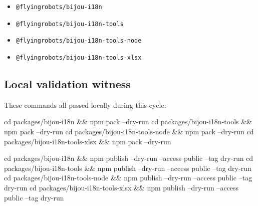 \begin{itemize}
\tightlist
\item
  \texttt{@\allowbreak{}f\allowbreak{}l\allowbreak{}y\allowbreak{}i\allowbreak{}n\allowbreak{}g\allowbreak{}r\allowbreak{}o\allowbreak{}b\allowbreak{}o\allowbreak{}t\allowbreak{}s\allowbreak{}/\allowbreak{}b\allowbreak{}i\allowbreak{}j\allowbreak{}o\allowbreak{}u\allowbreak{}-\allowbreak{}i\allowbreak{}1\allowbreak{}8\allowbreak{}n}
\item
  \texttt{@\allowbreak{}f\allowbreak{}l\allowbreak{}y\allowbreak{}i\allowbreak{}n\allowbreak{}g\allowbreak{}r\allowbreak{}o\allowbreak{}b\allowbreak{}o\allowbreak{}t\allowbreak{}s\allowbreak{}/\allowbreak{}b\allowbreak{}i\allowbreak{}j\allowbreak{}o\allowbreak{}u\allowbreak{}-\allowbreak{}i\allowbreak{}1\allowbreak{}8\allowbreak{}n\allowbreak{}-\allowbreak{}t\allowbreak{}o\allowbreak{}o\allowbreak{}l\allowbreak{}s}
\item
  \texttt{@\allowbreak{}f\allowbreak{}l\allowbreak{}y\allowbreak{}i\allowbreak{}n\allowbreak{}g\allowbreak{}r\allowbreak{}o\allowbreak{}b\allowbreak{}o\allowbreak{}t\allowbreak{}s\allowbreak{}/\allowbreak{}b\allowbreak{}i\allowbreak{}j\allowbreak{}o\allowbreak{}u\allowbreak{}-\allowbreak{}i\allowbreak{}1\allowbreak{}8\allowbreak{}n\allowbreak{}-\allowbreak{}t\allowbreak{}o\allowbreak{}o\allowbreak{}l\allowbreak{}s\allowbreak{}-\allowbreak{}n\allowbreak{}o\allowbreak{}d\allowbreak{}e}
\item
  \texttt{@\allowbreak{}f\allowbreak{}l\allowbreak{}y\allowbreak{}i\allowbreak{}n\allowbreak{}g\allowbreak{}r\allowbreak{}o\allowbreak{}b\allowbreak{}o\allowbreak{}t\allowbreak{}s\allowbreak{}/\allowbreak{}b\allowbreak{}i\allowbreak{}j\allowbreak{}o\allowbreak{}u\allowbreak{}-\allowbreak{}i\allowbreak{}1\allowbreak{}8\allowbreak{}n\allowbreak{}-\allowbreak{}t\allowbreak{}o\allowbreak{}o\allowbreak{}l\allowbreak{}s\allowbreak{}-\allowbreak{}x\allowbreak{}l\allowbreak{}s\allowbreak{}x}
\end{itemize}

\subsection{Local validation witness}\label{record-203-local-validation-witness}

These commands all passed locally during this cycle:

\begin{CodeBlock}
cd packages/bijou-i18n && npm pack --dry-run
cd packages/bijou-i18n-tools && npm pack --dry-run
cd packages/bijou-i18n-tools-node && npm pack --dry-run
cd packages/bijou-i18n-tools-xlsx && npm pack --dry-run

cd packages/bijou-i18n && npm publish --dry-run --access public --tag dry-run
cd packages/bijou-i18n-tools && npm publish --dry-run --access public --tag dry-run
cd packages/bijou-i18n-tools-node && npm publish --dry-run --access public --tag dry-run
cd packages/bijou-i18n-tools-xlsx && npm publish --dry-run --access public --tag dry-run
\end{CodeBlock}

